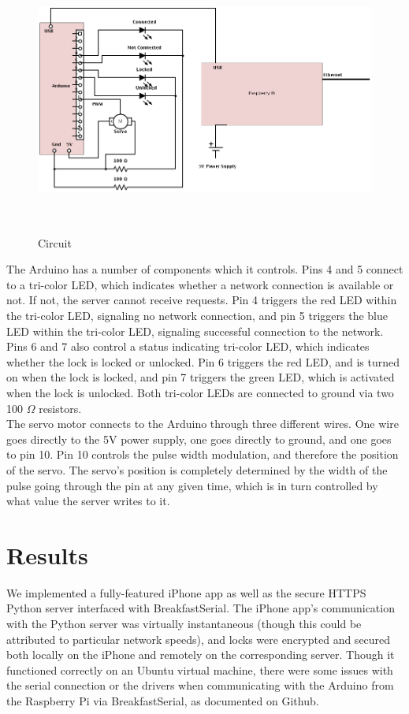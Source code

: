 \documentclass[10pt]{article}
\begin{document}
\begin{multicols}{2}
\begin{figure}[t!]
\centering
\includegraphics[height=3.5in]{circuit.png}
\caption{Circuit}
\end{figure}

The Arduino has a number of components which it controls. Pins 4 and 5 connect to a tri-color LED, which indicates whether a network connection is available or not. If not, the server cannot receive requests. Pin 4 triggers the red LED within the tri-color LED, signaling no network connection, and pin 5 triggers the blue LED within the tri-color LED, signaling successful connection to the network. Pins 6 and 7 also control a status indicating tri-color LED, which indicates whether the lock is locked or unlocked. Pin 6 triggers the red LED, and is turned on when the lock is locked, and pin 7 triggers the green LED, which is activated when the lock is unlocked. Both tri-color LEDs are connected to ground via two 100 $\Omega$ resistors. \\

The servo motor connects to the Arduino through three different wires. One wire goes directly to the 5V power supply, one goes directly to ground, and one goes to pin 10. Pin 10 controls the pulse width modulation, and therefore the position of the servo. The servo's position is completely determined by the width of the pulse going through the pin at any given time, which is in turn controlled by what value the server writes to it. \\


\section{Results}
We implemented a fully-featured iPhone app as well as the secure HTTPS Python server interfaced with BreakfastSerial. The iPhone app's communication with the Python server was virtually instantaneous (though this could be attributed to particular network speeds), and locks were encrypted and secured both locally on the iPhone and remotely on the corresponding server. Though it functioned correctly on an Ubuntu virtual machine, there were some issues \cite{breakfastserialissue} with the serial connection or the drivers when communicating with the Arduino from the Raspberry Pi via BreakfastSerial, as documented on Github. 


\end{multicols}
\end{document}
